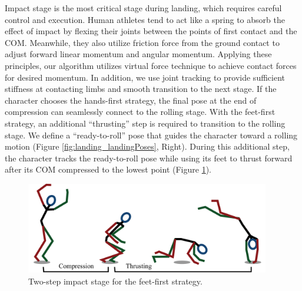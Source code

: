 Impact stage is the most critical stage during landing, which requires
careful control and execution. Human athletes tend to act like a
spring to absorb the effect of impact by flexing their joints between
the points of first contact and the COM. Meanwhile, they also utilize
friction force from the ground contact to adjust forward linear
momentum and angular momentum. Applying these principles, our
algorithm utilizes virtual force technique to achieve contact forces
for desired momentum. In addition, we use joint tracking to provide
sufficient stiffness at contacting limbs and smooth transition to the
next stage. If the character chooses the hands-first strategy, the
final pose at the end of compression can seamlessly connect to the
rolling stage. With the feet-first strategy, an additional
``thrusting'' step is required to transition to the rolling stage. We
define a ``ready-to-roll'' pose that guides the character toward a
rolling motion (Figure \ref{fig:landing_landingPoses}, Right). During this additional
step, the character tracks the ready-to-roll pose while using its feet
to thrust forward after its COM compressed to the lowest point (Figure
\ref{fig:landing_feet-first}).

\begin{figure}[htbp]
\center
\includegraphics[width=4.2in]{images/feet-first}
\caption{Two-step impact stage for the feet-first strategy.}
\label{fig:landing_feet-first}
\end{figure}

